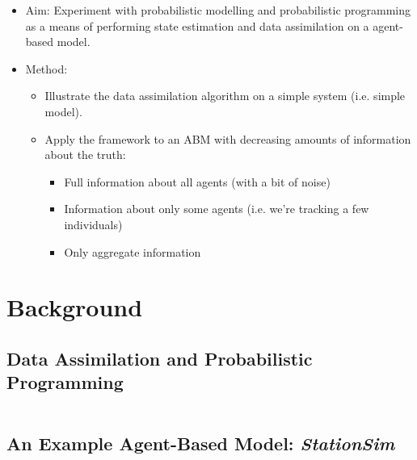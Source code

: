 \documentclass[11pt]{article}
\begin{document}
\begin{itemize}
\item Aim: Experiment with probabilistic modelling and probabilistic programming as a means of performing state estimation and data assimilation on a agent-based model.
\item Method:
	\begin{itemize}
	\item Illustrate the data assimilation algorithm on a simple system (i.e. simple model).
	\item Apply the framework to an ABM with decreasing amounts of information about the truth:
		\begin{itemize}
		\item Full information about all agents (with a bit of noise)
		\item Information about only some agents (i.e. we're tracking a few individuals)
		\item Only aggregate information
		\end{itemize}
	\end{itemize}
\end{itemize}

%
%
%
%
\section{Background}

\subsection{Data Assimilation and Probabilistic Programming}

$ $ %






\subsection{An Example Agent-Based Model: \textit{StationSim}}
\end{document}
